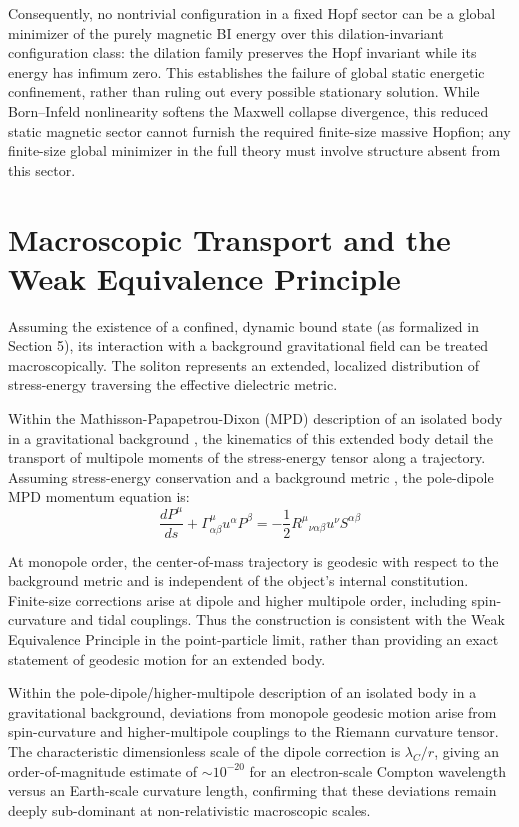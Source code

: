 \documentclass[11pt,a4paper]{article}
\begin{document}
Consequently, no nontrivial configuration in a fixed Hopf sector can be a global minimizer of the purely magnetic BI energy over this dilation-invariant configuration class: the dilation family preserves the Hopf invariant while its energy has infimum zero. This establishes the failure of global static energetic confinement, rather than ruling out every possible stationary solution. While Born--Infeld nonlinearity softens the Maxwell collapse divergence, this reduced static magnetic sector cannot furnish the required finite-size massive Hopfion; any finite-size global minimizer in the full theory must involve structure absent from this sector.

\section{Macroscopic Transport and the Weak Equivalence Principle}
Assuming the existence of a confined, dynamic bound state (as formalized in Section 5), its interaction with a background gravitational field can be treated macroscopically. The soliton represents an extended, localized distribution of stress-energy traversing the effective dielectric metric.

Within the Mathisson-Papapetrou-Dixon (MPD) description of an isolated body in a gravitational background \cite{Mathisson1937, Papapetrou1951, Dixon1970}, the kinematics of this extended body detail the transport of multipole moments of the stress-energy tensor along a trajectory. Assuming stress-energy conservation and a background metric \cite{Wald1984}, the pole-dipole MPD momentum equation is:
\begin{equation}
\frac{dP^\mu}{ds} + \Gamma^\mu_{\alpha\beta} u^\alpha P^\beta = -\frac{1}{2} R^\mu{}_{\nu\alpha\beta} u^\nu S^{\alpha\beta}
\end{equation}

At monopole order, the center-of-mass trajectory is geodesic with respect to the background metric and is independent of the object's internal constitution. Finite-size corrections arise at dipole and higher multipole order, including spin-curvature and tidal couplings. Thus the construction is consistent with the Weak Equivalence Principle in the point-particle limit, rather than providing an exact statement of geodesic motion for an extended body. 

Within the pole-dipole/higher-multipole description of an isolated body in a gravitational background, deviations from monopole geodesic motion arise from spin-curvature and higher-multipole couplings to the Riemann curvature tensor. The characteristic dimensionless scale of the dipole correction is $\lambda_C / r$, giving an order-of-magnitude estimate of $\sim 10^{-20}$ for an electron-scale Compton wavelength versus an Earth-scale curvature length, confirming that these deviations remain deeply sub-dominant at non-relativistic macroscopic scales.
\end{document}
